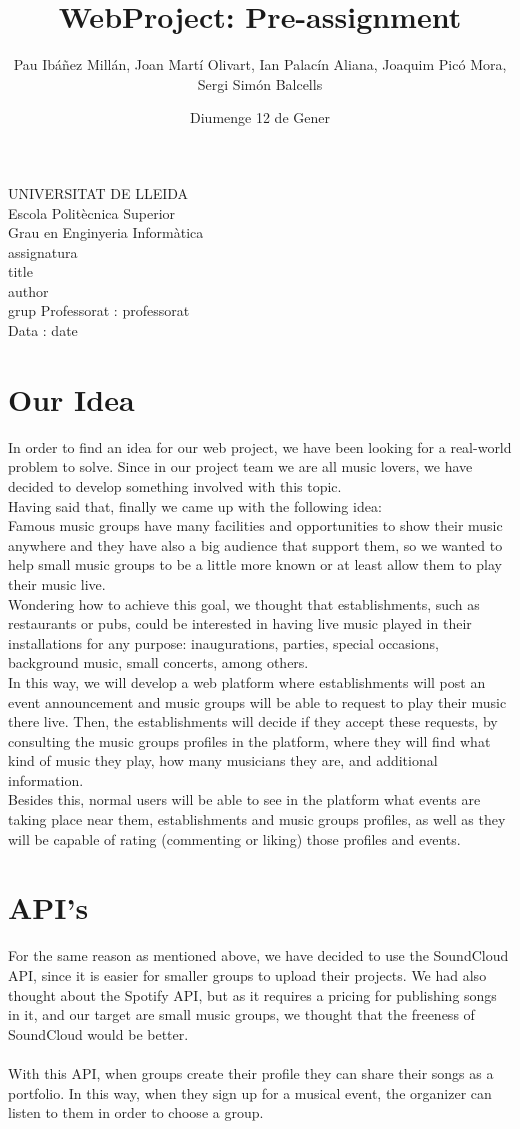 \documentclass{article}
\title{WebProject: Pre-assignment}
\author{Pau Ibáñez Millán, Joan Martí Olivart, Ian Palacín Aliana, Joaquim Picó Mora, Sergi Simón Balcells}
\date{Diumenge 12 de Gener}
\renewcommand{\maketitle}{ %
    \begin{titlepage}
        \raggedright{UNIVERSITAT DE LLEIDA \\
            Escola Politècnica Superior \\
            Grau en Enginyeria Informàtica\\
            \1assignatura\\}
            \vspace{5cm}
            \centering\huge{\5title \\}
            \vspace{3cm}
            \large{\6author} \\
            \normalsize{\3grup}
            \vfill
            Professorat : \4professorat \\
            Data : \7date
\end{titlepage}}
\begin{document}
    \maketitle
    \thispagestyle{empty}
    
    \newpage
    \tableofcontents
    \newpage
    
\section{Our Idea}
In order to find an idea for our web project, we have been looking for a real-world problem to solve. Since in our project team we are all music lovers, we have decided to develop something involved with this topic. \\
Having said that, finally we came up with the following idea: \\
Famous music groups have many facilities and opportunities to show their music anywhere and they have also a big audience that support them, so we wanted to help small music groups to be a little more known or at least allow them to play their music live. \\
Wondering how to achieve this goal, we thought that establishments, such as restaurants or pubs, could be interested in having live music played in their installations for any purpose: inaugurations, parties, special occasions, background music, small concerts, among others. \\
In this way, we will develop a web platform where establishments will post an event announcement and music groups will be able to request to play their music there live. Then, the establishments will decide if they accept these requests, by consulting the music groups profiles in the platform, where they will find what kind of music they play, how many musicians they are, and additional information. \\
Besides this, normal users will be able to see in the platform what events are taking place near them, establishments and music groups profiles, as well as they will be capable of rating (commenting or liking) those profiles and events. \\

\section{API's}
For the same reason as mentioned above, we have decided to use the SoundCloud API, since it is easier for smaller groups to upload their projects. We had also thought about the Spotify API, but as it requires a pricing for publishing songs in it, and our target are
small music groups, we thought that the freeness of SoundCloud would be better.
\\\\
With this API, when groups create their profile they can share their songs as a portfolio. In this way, when they sign up for a musical event, the organizer can listen to them in order to choose a group.
\newpage
\end{document}
